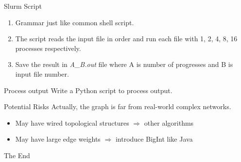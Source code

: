 \documentclass{beamer}
\begin{document}
\begin{frame}{Slurm Script}
\begin{enumerate}
	\item Grammar just like common shell script.
	\item The script reads the input file in order and run each file with 1, 2, 4, 8, 16 processes respectively.
	\item Save the result in \textit{A\_B.out} file where A is number of progresses and B is input file number.
\end{enumerate}
\end{frame}

\begin{frame}{Process output}
Write a Python script to process output.  
\end{frame}

\begin{frame}{Potential Risks}
Actually, the graph is far from real-world complex networks.
\begin{itemize}
\item May have wired topological structures $\Rightarrow$ other algorithms
\item May have large edge weights $\Rightarrow$ introduce BigInt like Java
\end{itemize}
\end{frame}




\begin{frame}
\Huge{\centerline{The End}}
\end{frame}
\end{document}
